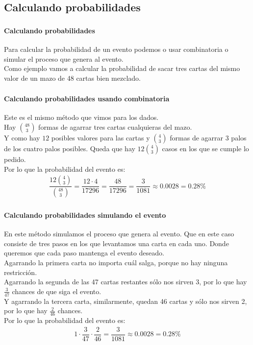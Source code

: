 \documentclass[../main.tex]{subfiles}
\begin{document}
\subsection{Calculando probabilidades}

\begin{frame}
  \frametitle{\SECTIONA}
  \framesubtitle{Calculando probabilidades}

  Para calcular la probabilidad de un evento podemos o usar combinatoria o simular el proceso que genera al evento. \pause \\
  Como ejemplo vamos a calcular la probabilidad de sacar tres cartas del mismo valor de un mazo de 48 cartas bien mezclado.
\end{frame}

\begin{frame}
  \frametitle{\SECTIONA}
  \framesubtitle{Calculando probabilidades usando combinatoria}

  Este es el mismo método que vimos para los dados. \pause \\
  Hay \(\binom{48}{3}\) formas de agarrar tres cartas cualquieras del mazo. \pause \\
  Y como hay \(12\) posibles valores para las cartas y \(\binom{4}{3}\) formas de agarrar 3 palos de los cuatro palos posibles. Queda que hay \(12\binom{4}{3}\) casos en los que se cumple lo pedido. \pause \\
  Por lo que la probabilidad del evento es:
  \begin{gather*}
    \dfrac{12\binom{4}{3}}{\binom{48}{3}} = \dfrac{12 \cdot 4}{17296} = \dfrac{48}{17296} = \dfrac{3}{1081} \approx 0.0028 = 0.28\%
  \end{gather*}
\end{frame}

\begin{frame}
  \frametitle{\SECTIONA}
  \framesubtitle{Calculando probabilidades simulando el evento}

  En este método simulamos el proceso que genera al evento. \pause Que en este caso consiste de tres pasos en los que levantamos una carta en cada uno. Donde queremos que cada paso mantenga el evento deseado. \pause \\
  Agarrando la primera carta no importa cuál salga, porque no hay ninguna restricción. \pause \\
  Agarrando la segunda de las 47 cartas restantes sólo nos sirven 3, por lo que hay \(\frac{3}{47}\) chances de que siga el evento. \pause \\
  Y agarrando la tercera carta, similarmente, quedan 46 cartas y sólo nos sirven 2, por lo que hay \(\frac{2}{46}\) chances. \pause \\ Por lo que la probabilidad del evento es:
  \begin{gather*}
    1 \cdot \dfrac{3}{47} \cdot \dfrac{2}{46} = \dfrac{3}{1081} \approx 0.0028 = 0.28\%
  \end{gather*}
\end{frame}
\end{document}
